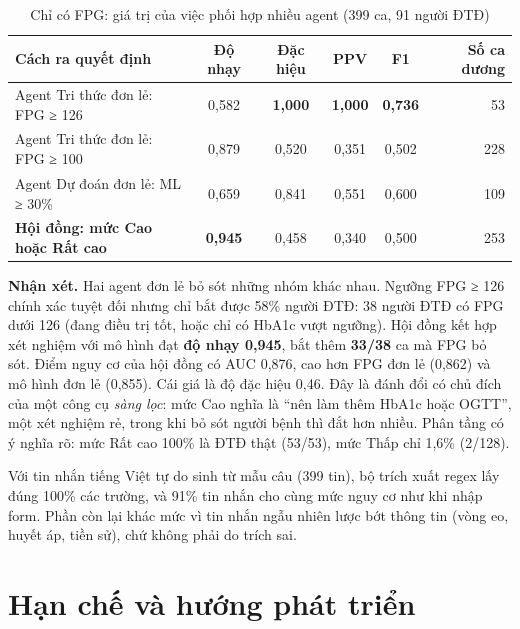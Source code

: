 \begin{table}[H]
\centering
\caption{Chỉ có FPG: giá trị của việc phối hợp nhiều agent (399 ca, 91 người ĐTĐ)}
\label{tab:k2}
\small
\begin{tabular}{@{}lccccr@{}}
\toprule
\textbf{Cách ra quyết định} & \textbf{Độ nhạy} & \textbf{Đặc hiệu} & \textbf{PPV} & \textbf{F1} & \textbf{Số ca dương} \\
\midrule
Agent Tri thức đơn lẻ: FPG ≥ 126 & 0,582 & \textbf{1,000} & \textbf{1,000} & \textbf{0,736} & 53 \\
Agent Tri thức đơn lẻ: FPG ≥ 100 & 0,879 & 0,520 & 0,351 & 0,502 & 228 \\
Agent Dự đoán đơn lẻ: ML ≥ 30\% & 0,659 & 0,841 & 0,551 & 0,600 & 109 \\
\textbf{Hội đồng: mức Cao hoặc Rất cao} & \textbf{0,945} & 0,458 & 0,340 & 0,500 & 253 \\
\bottomrule
\end{tabular}
\end{table}


\textbf{Nhận xét.} Hai agent đơn lẻ bỏ sót những nhóm khác nhau. Ngưỡng FPG ≥ 126 chính xác tuyệt đối nhưng chỉ bắt được 58\% người ĐTĐ: 38 người ĐTĐ có FPG dưới 126 (đang điều trị tốt, hoặc chỉ có HbA1c vượt ngưỡng). Hội đồng kết hợp xét nghiệm với mô hình đạt \textbf{độ nhạy 0,945}, bắt thêm \textbf{33/38} ca mà FPG bỏ sót. Điểm nguy cơ của hội đồng có AUC 0,876, cao hơn FPG đơn lẻ (0,862) và mô hình đơn lẻ (0,855). Cái giá là độ đặc hiệu 0,46. Đây là đánh đổi có chủ đích của một công cụ \emph{sàng lọc}: mức Cao nghĩa là ``nên làm thêm HbA1c hoặc OGTT'', một xét nghiệm rẻ, trong khi bỏ sót người bệnh thì đắt hơn nhiều. Phân tầng có ý nghĩa rõ: mức Rất cao 100\% là ĐTĐ thật (53/53), mức Thấp chỉ 1,6\% (2/128).

Với tin nhắn tiếng Việt tự do sinh từ mẫu câu (399 tin), bộ trích xuất regex lấy đúng 100\% các trường, và 91\% tin nhắn cho cùng mức nguy cơ như khi nhập form. Phần còn lại khác mức vì tin nhắn ngẫu nhiên lược bớt thông tin (vòng eo, huyết áp, tiền sử), chứ không phải do trích sai.

\section{Hạn chế và hướng phát triển}

